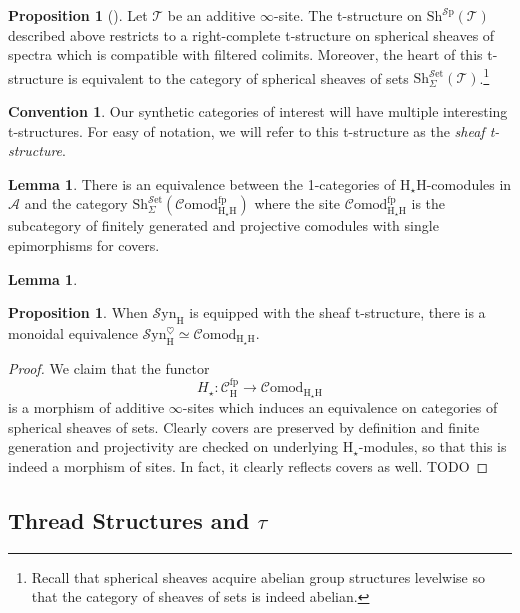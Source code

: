 \documentclass[10pt]{amsart}
\theoremstyle{definition}
\numberwithin{figure}{section}
\numberwithin{equation}{section}
\newtheorem{lemma}[figure]{Lemma}
\newtheorem{proposition}[figure]{Proposition}
\newtheorem{convention}[figure]{Convention}
\newcommand{\cA}{\mathcal{A}}
\newcommand{\cC}{\mathcal{C}}
\newcommand{\cT}{\mathcal{T}}
\theoremstyle{cited}
\newcommand{\Sp}{{\mathcal{S}\mathrm{p}}}
\newcommand{\Set}{{\mathcal{S}\mathrm{et}}}
\newcommand{\Sh}{\mathrm{Sh}}
\newcommand{\fp}{\mathrm{fp}}
\newcommand{\Syn}{\mathcal{S}\mathrm{yn}}
\renewcommand{\H}{\mathrm{H}}
\newcommand{\Comod}{\mathcal{C}\mathrm{omod}}
\begin{document}
\begin{proposition}[\cite{Pst22}]
  Let $\cT$ be an additive $\infty$-site. The t-structure on $\Sh^\Sp(\cT)$ described above restricts to a right-complete t-structure on spherical sheaves of spectra which is compatible with filtered colimits. Moreover, the heart of this t-structure is equivalent to the category of spherical sheaves of sets $\Sh_\Sigma^\Set(\cT)$.\footnote{Recall that spherical sheaves acquire abelian group structures levelwise so that the category of sheaves of sets is indeed abelian.}
\end{proposition}

\begin{convention}
  Our synthetic categories of interest will have multiple interesting t-structures. For easy of notation, we will refer to this t-structure as the \textit{sheaf t-structure}.
\end{convention}

\begin{lemma}
  There is an equivalence between the 1-categories of $\H_\star\H$-comodules in $\cA$ and the category $\Sh^{\Set}_\Sigma(\Comod_{\H_\star \H}^\fp)$ where the site $\Comod_{\H_\star \H}^\fp$ is the subcategory of finitely generated and projective comodules with single epimorphisms for covers.
\end{lemma}

\begin{lemma}
  
\end{lemma}

\begin{proposition}
  When $\Syn_\H$ is equipped with the sheaf t-structure, there is a monoidal equivalence $\Syn_\H^\heartsuit\simeq \Comod_{\H_\star \H}$.
\end{proposition}

\begin{proof}
  We claim that the functor
  \[
  H_\star:\cC_\H^\fp \to \Comod_{\H_\star\H}
  \]
  is a morphism of additive $\infty$-sites which induces an equivalence on categories of spherical sheaves of sets. Clearly covers are preserved by definition and finite generation and projectivity are checked on underlying $\H_\star$-modules, so that this is indeed a morphism of sites. In fact, it clearly reflects covers as well. TODO
\end{proof}


\subsection{Thread Structures and $\tau$}
\end{document}
